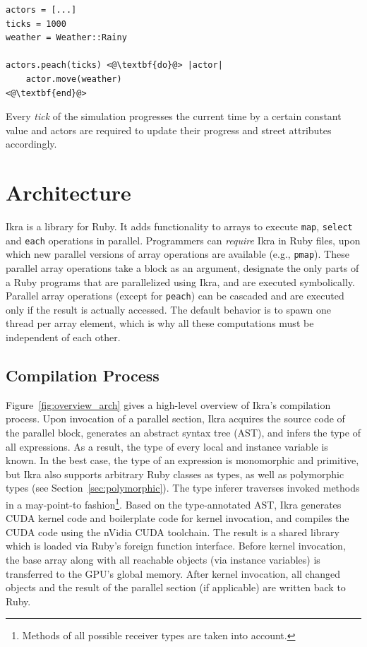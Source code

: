 \documentclass[preprint]{sigplanconf}
\begin{document}
\begin{lstlisting}
actors = [...]
ticks = 1000
weather = Weather::Rainy

actors.peach(ticks) <@\textbf{do}@> |actor|
    actor.move(weather)
<@\textbf{end}@>
\end{lstlisting}

Every \emph{tick} of the simulation progresses the current time by a certain constant value and actors are required to update their progress and street attributes accordingly.

\section{Architecture}
Ikra is a library for Ruby. It adds functionality to arrays to execute \texttt{map}, \texttt{select} and \texttt{each} operations in parallel. Programmers can \emph{require} Ikra in Ruby files, upon which new parallel versions of array operations are available (e.g., \texttt{pmap}). These parallel array operations take a block as an argument, designate the only parts of a Ruby programs that are parallelized using Ikra, and are executed symbolically. Parallel array operations (except for \texttt{peach}) can be cascaded and are executed only if the result is actually accessed. The default behavior is to spawn one thread per array element, which is why all these computations must be independent of each other. 

\subsection{Compilation Process}
Figure~\ref{fig:overview_arch} gives a high-level overview of Ikra's compilation process. Upon invocation of a parallel section, Ikra acquires the source code of the parallel block, generates an abstract syntax tree (AST), and infers the type of all expressions. As a result, the type of every local and instance variable is known. In the best case, the type of an expression is monomorphic and primitive, but Ikra also supports arbitrary Ruby classes as types, as well as polymorphic types (see Section~\ref{sec:polymorphic}). The type inferer traverses invoked methods in a may-point-to fashion\footnote{Methods of all possible receiver types are taken into account.}. Based on the type-annotated AST, Ikra generates CUDA kernel code and boilerplate code for kernel invocation, and compiles the CUDA code using the nVidia CUDA toolchain. The result is a shared library which is loaded via Ruby's foreign function interface. Before kernel invocation, the base array along with all reachable objects (via instance variables) is transferred to the GPU's global memory. After kernel invocation, all changed objects and the result of the parallel section (if applicable) are written back to Ruby.
\end{document}
